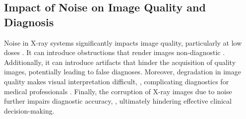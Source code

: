  

\subsection{Impact of Noise on Image Quality and Diagnosis}
\label{ch:LitReviewImpact of Noise on Image Quality and Diagnosis}

Noise in X-ray systems significantly impacts image quality, particularly at low doses \cite{veldkamp_dose_2009}. It can introduce obstructions that render images non-diagnostic \cite{manson_image_2019}. Additionally, it can introduce artifacts that hinder the acquisition of quality images, potentially leading to false diagnoses\cite{goyal_noise_2018}. Moreover, degradation in image quality makes visual interpretation difficult\cite{warner_understanding_2020}, \cite{lahmiri_iterative_2017}
, complicating diagnostics for medical professionals \cite{khan_new_2016}. Finally, the corruption of X-ray images due to noise further impairs diagnostic accuracy\cite{chandra_analysis_2020},\cite{umadevi_improved_2011}
,\cite{dong_x-ray_2020} ultimately hindering effective clinical decision-making.


